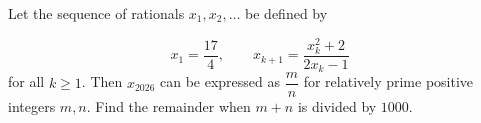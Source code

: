 Let the sequence of rationals \(x_1,x_2,\ldots\) be defined by

\[
x_1=\dfrac{17}{4}, \qquad x_{k+1}=\dfrac{x_k^2+2}{2x_k-1}
\]for all \(k\ge 1\). Then \(x_{2026}\) can be expressed as \(\dfrac{m}{n}\) for relatively prime positive integers \(m,n\). Find the remainder when \(m+n\) is divided by \(1000\).
